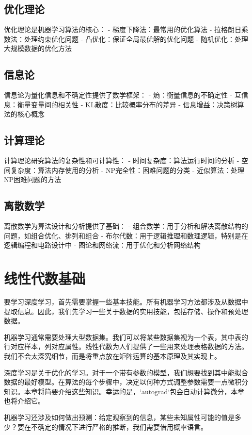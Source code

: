 \subsection{优化理论}
优化理论是机器学习算法的核心：
- 梯度下降法：最常用的优化算法
- 拉格朗日乘数法：处理约束优化问题
- 凸优化：保证全局最优解的优化问题
- 随机优化：处理大规模数据的优化方法

\subsection{信息论}
信息论为量化信息和不确定性提供了数学框架：
- 熵：衡量信息的不确定性
- 互信息：衡量变量间的相关性
- KL散度：比较概率分布的差异
- 信息增益：决策树算法的核心概念

\subsection{计算理论}
计算理论研究算法的复杂性和可计算性：
- 时间复杂度：算法运行时间的分析
- 空间复杂度：算法内存使用的分析
- NP完全性：困难问题的分类
- 近似算法：处理NP困难问题的方法

\subsection{离散数学}
离散数学为算法设计和分析提供了基础：
- 组合数学：用于分析和解决离散结构的问题，如组合优化、排列和组合
- 布尔代数：用于逻辑推理和数理逻辑，特别是在逻辑编程和电路设计中
- 图论和网络流：用于优化和分析网络结构

\section{线性代数基础}

要学习深度学习，首先需要掌握一些基本技能。所有机器学习方法都涉及从数据中提取信息。因此，我们先学习一些关于数据的实用技能，包括存储、操作和预处理数据。

机器学习通常需要处理大型数据集。我们可以将某些数据集视为一个表，其中表的行对应样本，列对应属性。线性代数为人们提供了一些用来处理表格数据的方法。我们不会太深究细节，而是将重点放在矩阵运算的基本原理及其实现上。

深度学习是关于优化的学习。对于一个带有参数的模型，我们想要找到其中能拟合数据的最好模型。在算法的每个步骤中，决定以何种方式调整参数需要一点微积分知识。本章将简要介绍这些知识。幸运的是，`autograd`包会自动计算微分，本章也将介绍它。

机器学习还涉及如何做出预测：给定观察到的信息，某些未知属性可能的值是多少？要在不确定的情况下进行严格的推断，我们需要借用概率语言。

